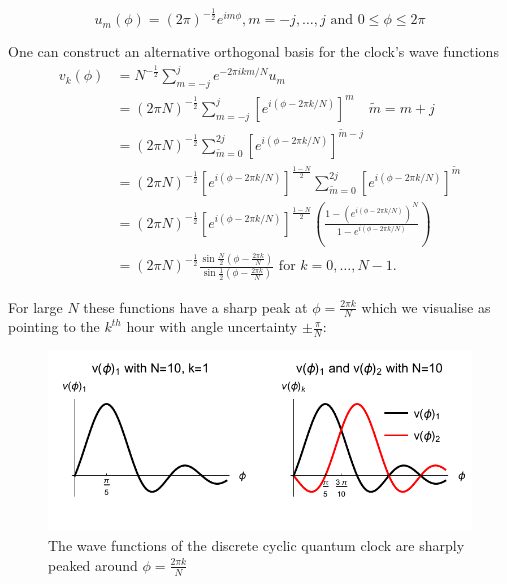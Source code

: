 \documentclass{article}
\begin{document}
\begin{equation}
	u_m(\phi) = (2\pi)^{-\frac{1}{2}}e^{im\phi}, m = -j,\dots, j \text{ and } 0 \leq \phi \leq 2\pi
\end{equation}

\noindent One can construct an alternative orthogonal basis for the clock's wave functions
\begin{subequations}
\begin{align}
	v_k(\phi) &= N^{-\frac{1}{2}}\sum_{m=-j}^j e^{-2\pi ikm/N}u_m \label{vkexpansion}\\
		    &= (2\pi N)^{-\frac{1}{2}}\sum_{m=-j}^j [e^{i(\phi-2\pi k/N)}]^m \quad \tilde{m} = m+j \\
		    &= (2\pi N)^{-\frac{1}{2}}\sum_{\tilde{m}=0}^{2j} [e^{i(\phi-2\pi k/N)}]^{\tilde{m}-j} \\
		    &= (2\pi N)^{-\frac{1}{2}}[e^{i(\phi-2\pi k/N)}]^{\frac{1-N}{2}}\sum_{\tilde{m}=0}^{2j}[e^{i(\phi-2\pi k/N)}]^{\tilde{m}} \\
		    &= (2\pi N)^{-\frac{1}{2}}[e^{i(\phi-2\pi k/N)}]^{\frac{1-N}{2}}\left(\frac{1-(e^{i(\phi-2\pi k/N)})^N}{1-e^{i(\phi-2\pi k/N)}}\right) \\
		    &= (2\pi N)^{-\frac{1}{2}}\frac{\sin{\frac{N}{2}(\phi-\frac{2\pi k}{N})}}{\sin{\frac{1}{2}(\phi-\frac{2\pi k}{N})}} \text{ for } k = 0,\dots,N-1.
\end{align}
\end{subequations}

\noindent For large $N$ these functions have a sharp peak at $\phi = \frac{2\pi k}{N}$ which we visualise as pointing to the $k^{th}$ hour with angle uncertainty $\pm \frac{\pi}{N}$:

\begin{figure}[ht]
\centering
\includegraphics{plot1.pdf}
\caption{The wave functions of the discrete cyclic quantum clock are sharply peaked around $\phi = \frac{2\pi k}{N}$}
\end{figure}
\end{document}
